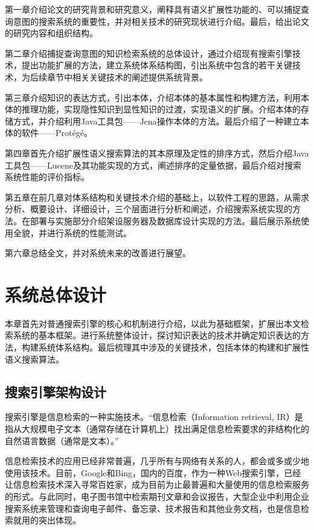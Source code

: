 \documentclass[12pt,a4paper]{article}
\begin{document}
	第一章介绍论文的研究背景和研究意义，阐释具有语义扩展性功能的、可以捕捉查询意图的搜索系统的重要性，并对相关技术的研究现状进行介绍。最后，给出论文的研究内容和组织结构。

	第二章介绍捕捉查询意图的知识检索系统的总体设计，通过介绍现有搜索引擎技术，提出功能扩展的方法，建立系统体系结构图，引出系统中包含的若干关键技术，为后续章节中相关关键技术的阐述提供系统背景。

	第三章介绍知识的表达方式，引出本体，介绍本体的基本属性和构建方法，利用本体的推理功能，实现隐性知识到显性知识的过渡，实现语义的扩展。介绍本体的存储方式，并介绍利用{\Times Java}工具包——{\Times Jena}操作本体的方法。最后介绍了一种建立本体的软件——{\Times Prot{\'e}g{\'e}}。

	第四章首先介绍扩展性语义搜索算法的其本原理及定性的排序方式，然后介绍{\Times Java}工具包——{\Times Lucene}及其功能实现的方式，阐述排序的定量依据，最后介绍对搜索系统性能的评价指标。

	第五章在前几章对体系结构和关键技术介绍的基础上，以软件工程的思路，从需求分析、概要设计、详细设计，三个层面进行分析和阐述，介绍搜索系统实现的方法。在部署与实施部分介绍架设服务器及数据库设计实现的方法。最后展示系统使用全貌，并进行系统的性能测试。

	第六章总结全文，并对系统未来的改善进行展望。
\newpage	
\section{系统总体设计}
\setcounter{figure}{0}
\setcounter{table}{0}
\setcounter{equation}{0}
	本章首先对普通搜索引擎的核心和机制进行介绍，以此为基础框架，扩展出本文检索系统的基本框架。进行系统整体设计，探讨知识表达的技术并确定知识表达的方法，构建系统体系结构。最后梳理其中涉及的关键技术，包括本体的构建和扩展性语义搜索算法。
	\subsection{搜索引擎架构设计}
	搜索引擎是信息检索的一种实施技术。“信息检索（{\Times Information retrieval, IR}）是指从大规模电子文本（通常存储在计算机上）找出满足信息检索要求的非结构化的自然语言数据（通常是文本）。”\cite{23}
	
	信息检索技术的应用已经非常普遍，几乎所有与网络有关系的人，都会或多或少地使用该技术。目前，{\Times Google}和{\Times Bing}，国内的百度，作为一种{\Times Web}搜索引擎，已经让信息检索技术深入寻常百姓家，成为目前为止最普遍和大量使用的信息检索服务的形式。与此同时，电子图书馆中检索期刊文章和会议报告，大型企业中利用企业搜索系统来管理和查询电子邮件、备忘录、技术报告和其他业务文档，也是信息检索就用的突出体现。
	
\end{document}
